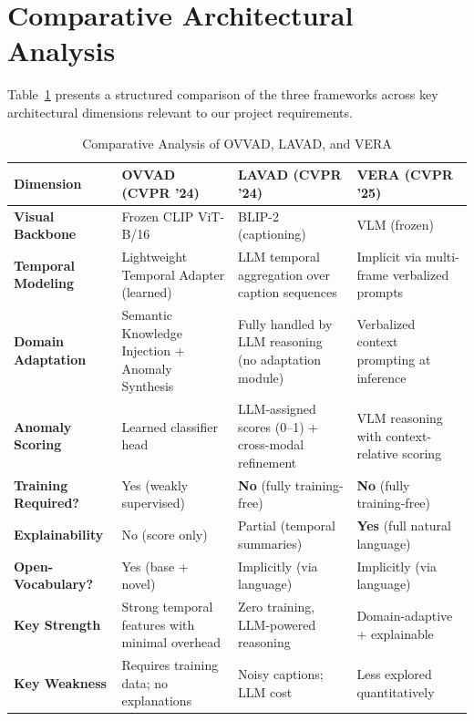 \documentclass[12pt, a4paper]{article}
\begin{document}
\section{Comparative Architectural Analysis}

Table~\ref{tab:comparison} presents a structured comparison of the three frameworks across key architectural dimensions relevant to our project requirements.

\begin{table}[h!]
\centering
\caption{Comparative Analysis of OVVAD, LAVAD, and VERA}
\label{tab:comparison}
\renewcommand{\arraystretch}{1.35}
\small
\begin{tabular}{@{} p{2.8cm} p{3.8cm} p{3.8cm} p{3.8cm} @{}}
\toprule
\textbf{Dimension} & \textbf{OVVAD (CVPR '24)} & \textbf{LAVAD (CVPR '24)} & \textbf{VERA (CVPR '25)} \\
\midrule
\textbf{Visual Backbone} & Frozen CLIP ViT-B/16 & BLIP-2 (captioning) & VLM (frozen) \\
\addlinespace
\textbf{Temporal Modeling} & Lightweight Temporal Adapter (learned) & LLM temporal aggregation over caption sequences & Implicit via multi-frame verbalized prompts \\
\addlinespace
\textbf{Domain Adaptation} & Semantic Knowledge Injection + Anomaly Synthesis & Fully handled by LLM reasoning (no adaptation module) & Verbalized context prompting at inference \\
\addlinespace
\textbf{Anomaly Scoring} & Learned classifier head & LLM-assigned scores (0--1) + cross-modal refinement & VLM reasoning with context-relative scoring \\
\addlinespace
\textbf{Training Required?} & Yes (weakly supervised) & \textbf{No} (fully training-free) & \textbf{No} (fully training-free) \\
\addlinespace
\textbf{Explainability} & No (score only) & Partial (temporal summaries) & \textbf{Yes} (full natural language) \\
\addlinespace
\textbf{Open-Vocabulary?} & Yes (base + novel) & Implicitly (via language) & Implicitly (via language) \\
\addlinespace
\textbf{Key Strength} & Strong temporal features with minimal overhead & Zero training, LLM-powered reasoning & Domain-adaptive + explainable \\
\addlinespace
\textbf{Key Weakness} & Requires training data; no explanations & Noisy captions; LLM cost & Less explored quantitatively \\
\bottomrule
\end{tabular}
\end{table}
\end{document}
